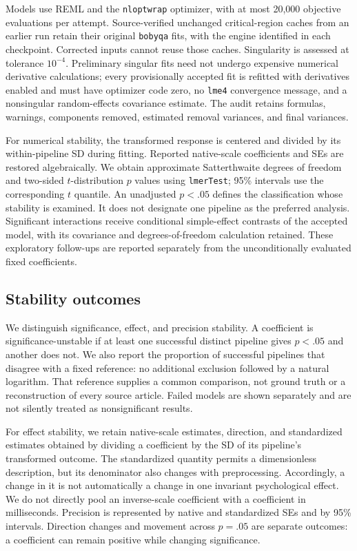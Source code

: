 Models use REML and the \texttt{nloptwrap} optimizer, with at most
20,000 objective evaluations per attempt. Source-verified unchanged
critical-region caches from an earlier run retain their original
\texttt{bobyqa} fits, with the engine identified in each checkpoint.
Corrected inputs cannot reuse those caches. Singularity is assessed
at tolerance \(10^{-4}\). Preliminary singular fits need not undergo
expensive numerical derivative calculations; every provisionally accepted
fit is refitted with derivatives enabled and must have optimizer code zero,
no \texttt{lme4} convergence message, and a nonsingular random-effects
covariance estimate. The audit retains formulas, warnings, components
removed, estimated removal variances, and final variances.

For numerical stability, the transformed response is centered and divided
by its within-pipeline SD during fitting. Reported native-scale coefficients
and SEs are restored algebraically. We obtain approximate Satterthwaite
degrees of freedom and two-sided \(t\)-distribution \(p\) values using
\texttt{lmerTest}; 95\% intervals use the corresponding \(t\) quantile.
An unadjusted \(p<.05\) defines the classification whose stability is
examined. It does not designate one pipeline as the preferred analysis.
Significant interactions receive conditional simple-effect contrasts of
the accepted model, with its covariance and degrees-of-freedom calculation
retained. These exploratory follow-ups are reported separately from the
unconditionally evaluated fixed coefficients.

\subsection{Stability outcomes}

We distinguish significance, effect, and precision stability. A coefficient
is significance-unstable if at least one successful distinct pipeline gives
\(p<.05\) and another does not. We also report the proportion of successful
pipelines that disagree with a fixed reference: no additional exclusion
followed by a natural logarithm. That reference supplies a common
comparison, not ground truth or a reconstruction of every source article.
Failed models are shown separately and are not silently treated as
nonsignificant results.

For effect stability, we retain native-scale estimates, direction,
and standardized estimates obtained by dividing a coefficient by the SD of
its pipeline's transformed outcome. The standardized quantity permits a
dimensionless description, but its denominator also changes with
preprocessing. Accordingly, a change in it is not automatically a change in
one invariant psychological effect. We do not directly pool an
inverse-scale coefficient with a coefficient in milliseconds. Precision
is represented by native and standardized SEs and by 95\% intervals.
Direction changes and movement across \(p=.05\) are separate outcomes:
a coefficient can remain positive while changing significance.

